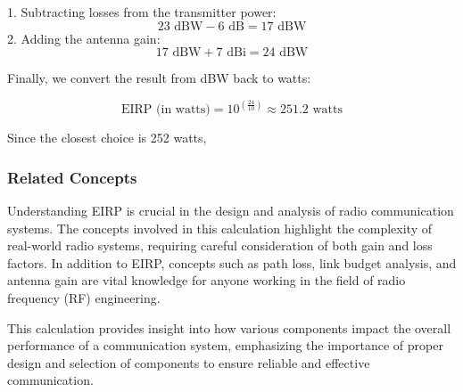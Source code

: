 1. Subtracting losses from the transmitter power:
   \[
   23 \text{ dBW} - 6 \text{ dB} = 17 \text{ dBW}
   \]
2. Adding the antenna gain:
   \[
   17 \text{ dBW} + 7 \text{ dBi} = 24 \text{ dBW}
   \]

Finally, we convert the result from dBW back to watts:

\[
\text{EIRP (in watts)} = 10^{\left(\frac{24}{10}\right)} \approx 251.2 \text{ watts}
\]

Since the closest choice is 252 watts, 

\subsubsection{Related Concepts}

Understanding EIRP is crucial in the design and analysis of radio communication systems. The concepts involved in this calculation highlight the complexity of real-world radio systems, requiring careful consideration of both gain and loss factors. In addition to EIRP, concepts such as path loss, link budget analysis, and antenna gain are vital knowledge for anyone working in the field of radio frequency (RF) engineering.

This calculation provides insight into how various components impact the overall performance of a communication system, emphasizing the importance of proper design and selection of components to ensure reliable and effective communication.
